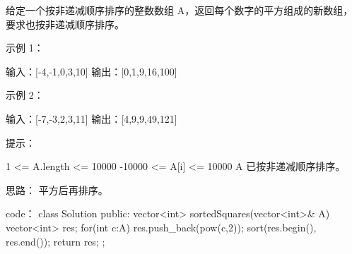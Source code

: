 给定一个按非递减顺序排序的整数数组 A，返回每个数字的平方组成的新数组，要求也按非递减顺序排序。

 

示例 1：

输入：[-4,-1,0,3,10]
输出：[0,1,9,16,100]

示例 2：

输入：[-7,-3,2,3,11]
输出：[4,9,9,49,121]

 

提示：

    1 <= A.length <= 10000
    -10000 <= A[i] <= 10000
    A 已按非递减顺序排序。















思路：
平方后再排序。
























code：
class Solution {
public:
    vector<int> sortedSquares(vector<int>& A) {
        vector<int> res;
        for(int c:A) res.push_back(pow(c,2));
        sort(res.begin(), res.end());
        return res;
    }
};